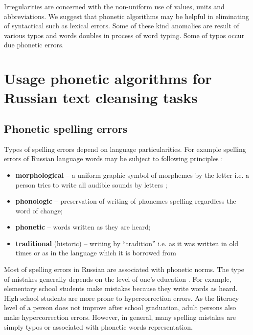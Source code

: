 \documentclass[conference,a4paper]{IEEEtran}
\begin{document}
Irregularities are concerned with the non-uniform use of values, units and abbreviations.
We suggest that phonetic algorithms may be helpful in eliminating of syntactical such as lexical errors. Some of these kind anomalies are result of various typos and words doubles in process of word typing. Some of typos occur due phonetic errors.

\section{Usage phonetic algorithms for Russian text cleansing tasks}
\subsection{Phonetic spelling errors}
Types of spelling errors depend on language particularities. For example spelling errors of Russian language words may be subject to following principles \cite{Skripnik-2010}:
\begin{itemize}
\item \textbf{morphological} – a uniform graphic symbol of morphemes by the letter i.e. a person tries to write all audible sounds by letters \cite{Valgina-2002};
\item \textbf{phonologic} – preservation of writing of phonemes spelling regardless the word of change;
\item \textbf{phonetic} – words written as they are heard;
\item \textbf{traditional} (historic) – writing by “tradition” i.e. as it was written in old times or as in the language which it is borrowed from
\end{itemize}

Most of spelling errors in Russian are associated with phonetic norms. The type of mistakes generally depends on the level of one’s education \cite{Parubchenko-2005}. For example, elementary school students make mistakes because they write words as heard. High school students are more prone to hypercorrection errors. As the literacy level of a person does not improve after school graduation, adult persons also make hypercorrection errors. However, in general, many spelling mistakes are simply typos or associated with phonetic words representation.
\end{document}
